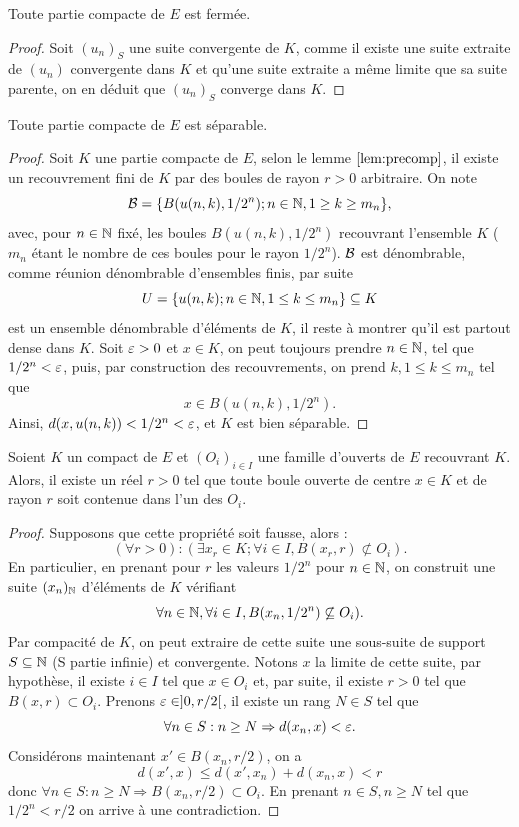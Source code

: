\begin{lem}
Toute partie compacte de $E$ est fermée.
\end{lem}

\begin{proof}
Soit $(u_n)_S$ une suite convergente de $K$, comme il existe une suite extraite de $(u_n)$ convergente dans $K$ 
et qu'une suite extraite a même limite que sa suite parente, on en déduit que $(u_n)_S$ converge dans $K$.
\end{proof}

\begin{prop}
Toute partie compacte de $E$ est séparable.
\end{prop}

\begin{proof}
Soit $K$ une partie compacte de $E$, selon le lemme $\ref{lem:precomp}$, 
il existe un recouvrement fini de $K$ par des boules de rayon $r>0$ arbitraire.
On note 
\[ \mathcal{B}=\{ B(u(n,k), 1/2^n) ; n \in \mathbb{N}, 1 \geq k \geq m_n \}, \]
avec, pour $n \in \mathbb{N}$ fixé, les boules $B(u(n,k), 1/2^n)$ recouvrant l'ensemble $K$ ($m_n$ étant le nombre de ces boules pour le rayon $1/2^n$).
$\mathcal{B}$ est dénombrable, comme réunion dénombrable d'ensembles finis, par suite 
\[ U = \{ u(n,k) ; n \in \mathbb{N}, 1 \leq k \leq m_n \}  \subseteq K \]
est un ensemble dénombrable d'éléments de $K$, il reste à montrer qu'il est partout dense dans $K$. Soit $\varepsilon >0$ et $x \in K$, on peut toujours prendre $n \in \mathbb{N}$, tel que $1/2^n < \varepsilon$, puis, par construction des recouvrements, on prend $k, 1 \leq k \leq m_n$ tel que 
\[ x \in B(u(n,k), 1/2^n) . \]
Ainsi, $d(x, u(n,k)) < 1/2^n < \varepsilon$, et $K$ est bien séparable.
\end{proof}

\begin{lem}[Lebesgue]
\label{lem:lebesg}
Soient $K$ un compact de $E$ et $(O_i)_{i \in I}$ une famille d'ouverts de $E$ recouvrant $K$. Alors, il existe un réel $r>0$ tel que toute boule ouverte de centre $x \in K$ et de rayon $r$ soit contenue dans l'un des $O_i$.
\end{lem}

\begin{proof}
Supposons que cette propriété soit fausse, alors :
\[ (\forall r > 0) : (\exists x_r \in K ; \forall i \in I, B(x_r, r) \not \subset O_i). \]
En particulier, en prenant pour $r$ les valeurs $1/2^n$ pour $n \in \mathbb{N}$, on construit une suite $(x_n)_{\mathbb{N}}$ d'éléments de $K$ vérifiant 
\[ \forall n \in \mathbb{N}, \forall  i \in I, B(x_n, 1/2^n) \not \subseteq O_i). \]
Par compacité de $K$, on peut extraire de cette suite une sous-suite de support $S \subseteq \mathbb{N}$ (S partie infinie) et convergente. Notons $x$ la limite de cette suite, par hypothèse, il existe $i \in I$ tel que $x \in O_i$ et, par suite, il existe $r >0$ tel que $B(x,r) \subset O_i$. Prenons $\varepsilon \in ]0, r/2 [$, il existe un rang $N \in S$ tel que 
\[ \forall n \in S : n \geq N \Rightarrow d(x_n,x) < \varepsilon . \]
Considérons maintenant $x' \in B(x_n, r/2)$, on a
\[ d(x', x) \leq d(x', x_n) + d(x_n, x) < r \]
donc $\forall n \in S : n \geq N \Rightarrow B(x_n, r/2) \subset O_i$. En prenant $n \in S, n \geq N$ tel que $1/2^n < r/2$ on arrive à une contradiction.
\end{proof}

